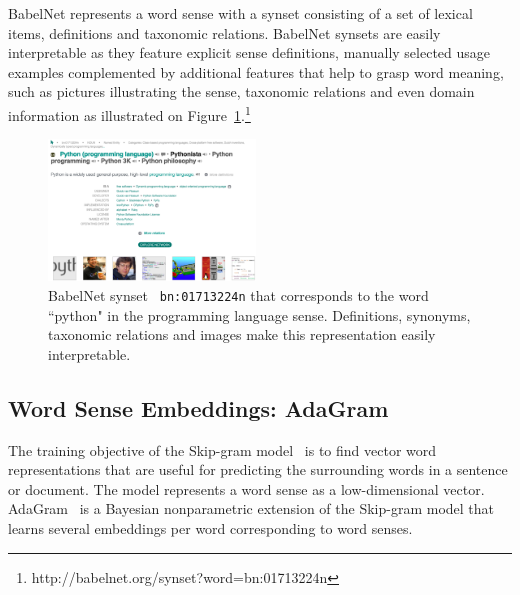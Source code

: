 \documentclass[10pt, a4paper]{article}
\begin{document}
BabelNet represents a word sense with a synset consisting of a set of lexical items, definitions and taxonomic relations. BabelNet synsets are easily interpretable as they feature explicit sense definitions, manually selected usage examples complemented by additional features that help to grasp word meaning, such as pictures illustrating the sense, taxonomic relations and even domain information as illustrated on  Figure~\ref{fig:synset}.\footnote{http://babelnet.org/synset?word=bn:01713224n}


\begin{figure}[h]
	\begin{center}
	\includegraphics[width=0.49\textwidth]{figures/babelnet}

	\end{center}
	\caption{ BabelNet synset \texttt{ \small bn:01713224n} that corresponds to the  word ``python" in the programming language sense. Definitions, synonyms, taxonomic relations and images make this representation easily interpretable. }
	\label{fig:synset}
\end{figure}


\subsection{Word Sense Embeddings: AdaGram }

The training objective of the Skip-gram model~\cite{mikolov2013efficient} is to find vector word representations that are useful for predicting the surrounding words in a sentence or document. The model represents a word sense as a low-dimensional vector. AdaGram~\cite{bartunov2015breaking} is a Bayesian nonparametric extension of the Skip-gram model that learns several embeddings per word corresponding to word senses. 
 
\end{document}
